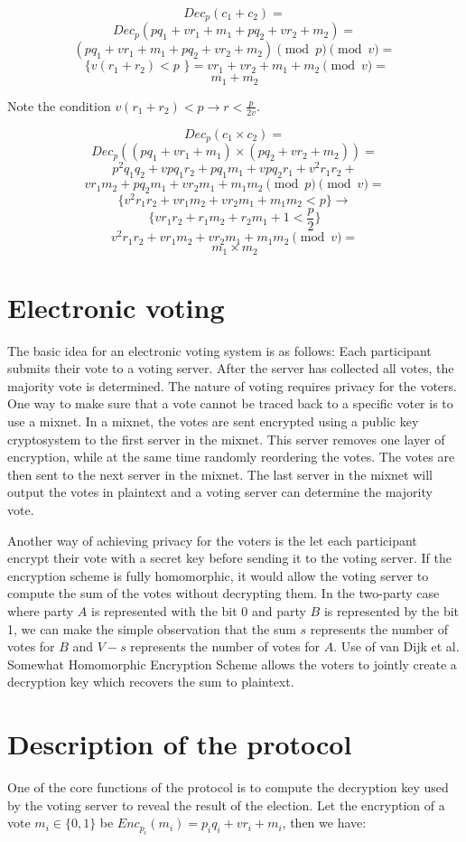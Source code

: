 \documentclass[10pt,twocolumn]{article}
\begin{document}
$$Dec_p(c_1 + c_2) =$$
$$Dec_p(pq_1+vr_1+m_1+pq_2+vr_2+m_2) =$$
$$(pq_1+vr_1+m_1+pq_2+vr_2+m_2) \pmod p \pmod v =$$
$$\text{ \{ } v(r_1+r_2) < p \text{ \} } = vr_1 + vr_2 + m_1 + m_2 \pmod v =$$
$$m_1 + m_2$$

Note the condition $v(r_1+r_2)<p \rightarrow r < \frac{p}{2v}$.

$$Dec_p(c_1 \times c_2) =$$
$$Dec_p((pq_1+vr_1+m_1) \times (pq_2+vr_2+m_2)) =$$
$$p^2q_1q_2 + vpq_1r_2 + pq_1m_1 + vpq_2r_1 + v^2r_1r_2 +$$
$$vr_1m_2 + pq_2m_1 + vr_2m_1 + m_1m_2 \pmod p \pmod v =$$
$$\big\{ v^2r_1r_2+vr_1m_2+vr_2m_1+m_1m_2 < p \big\} \rightarrow$$
$$\big\{ vr_1r_2 + r_1m_2 + r_2m_1 + 1 < \frac{p}{2} \big\}$$
$$v^2r_1r_2+vr_1m_2+vr_2m_1+m_1m_2 \pmod v =$$
$$m_1 \times m_2$$

\section{Electronic voting}
The basic idea for an electronic voting system is as follows: Each participant submits their vote to a voting server. After the server has collected all votes, the majority vote is determined. The nature of voting requires privacy for the voters. One way to make sure that a vote cannot be traced back to a specific voter is to use a mixnet\cite{wikstrom04}. In a mixnet, the votes are sent encrypted using a public key cryptosystem to the first server in the mixnet. This server removes one layer of encryption, while at the same time randomly reordering the votes. The votes are then sent to the next server in the mixnet. The last server in the mixnet will output the votes in plaintext and a voting server can determine the majority vote. 

Another way of achieving privacy for the voters is the let each participant encrypt their vote with a secret key before sending it to the voting server. If the encryption scheme is fully homomorphic, it would allow the voting server to compute the sum of the votes without decrypting them. In the two-party case where party $A$ is represented with the bit $0$ and party $B$ is represented by the bit 1, we can make the simple observation that the sum $s$ represents the number of votes for $B$ and $V-s$ represents the number of votes for $A$. Use of van Dijk et al. Somewhat Homomorphic Encryption Scheme allows the voters to jointly create a decryption key which recovers the sum to plaintext.

\section{Description of the protocol}
One of the core functions of the protocol is to compute the decryption key used by the voting server to reveal the result of the election. Let the encryption of a vote $m_i \in \{0, 1\}$ be $Enc_{p_i}(m_i)=p_iq_i+vr_i+m_i$, then we have:
\end{document}
